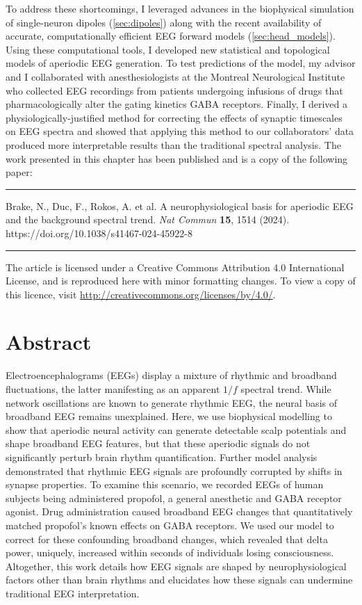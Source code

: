 To address these shortcomings, I leveraged advances in the biophysical simulation of single-neuron dipoles (\autoref{sec:dipoles}) along with the recent availability of accurate, computationally efficient EEG forward models (\autoref{sec:head_models}). Using these computational tools, I developed new statistical and topological models of aperiodic EEG generation. To test predictions of the model, my advisor and I collaborated with anesthesiologists at the Montreal Neurological Institute who collected EEG recordings from patients undergoing infusions of drugs that pharmacologically alter the gating kinetics GABA receptors. Finally, I derived a physiologically-justified method for correcting the effects of synaptic timescales on EEG spectra and showed that applying this method to our collaborators' data produced more interpretable results than the traditional spectral analysis. The work presented in this chapter has been published and is a copy of the following paper:

\vspace{1em}
\hrule
\vspace{.5em}
\noindent
\hangindent=1cm
Brake, N., Duc, F., Rokos, A. et al. A neurophysiological basis for aperiodic EEG and the background spectral trend. \textit{Nat Commun} \textbf{15}, 1514 (2024). https://doi.org/10.1038/s41467-024-45922-8
\vspace{.75em}
\hrule
\vspace{.65em}

\noindent
The article is licensed under a Creative Commons Attribution 4.0 International License, and is reproduced here with minor formatting changes. To view a copy of this licence, visit \url{http://creativecommons.org/licenses/by/4.0/}.


\newpage

\section{Abstract}
Electroencephalograms (EEGs) display a mixture of rhythmic and broadband fluctuations, the latter manifesting as an apparent $1/f$ spectral trend. While network oscillations are known to generate rhythmic EEG, the neural basis of broadband EEG remains unexplained. Here, we use biophysical modelling to show that aperiodic neural activity can generate detectable scalp potentials and shape broadband EEG features, but that these aperiodic signals do not significantly perturb brain rhythm quantification. Further model analysis demonstrated that rhythmic EEG signals are profoundly corrupted by shifts in synapse properties. To examine this scenario, we recorded EEGs of human subjects being administered propofol, a general anesthetic and GABA receptor agonist. Drug administration caused broadband EEG changes that quantitatively matched propofol’s known effects on GABA receptors. We used our model to correct for these confounding broadband changes, which revealed that delta power, uniquely, increased within seconds of individuals losing consciousness. Altogether, this work details how EEG signals are shaped by neurophysiological factors other than brain rhythms and elucidates how these signals can undermine traditional EEG interpretation.


